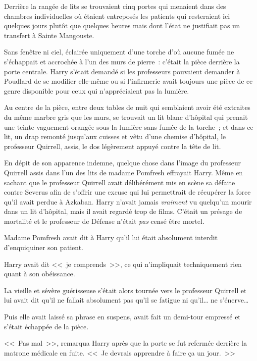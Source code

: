 Derrière la rangée de lits se trouvaient cinq portes qui menaient dans des chambres individuelles où étaient entreposés les patients qui resteraient ici quelques jours plutôt que quelques heures mais dont l'état ne justifiait pas un transfert à Sainte Mangouste.

Sans fenêtre ni ciel, éclairée uniquement d'une torche d'où aucune fumée ne s'échappait et accrochée à l'un des murs de pierre~: c'était la pièce derrière la porte centrale. Harry s'était demandé si les professeurs pouvaient demander à Poudlard de se modifier elle-même ou si l'infirmerie avait toujours une pièce de ce genre disponible pour ceux qui n'appréciaient pas la lumière.

Au centre de la pièce, entre deux tables de nuit qui semblaient avoir été extraites du même marbre gris que les murs, se trouvait un lit blanc d'hôpital qui prenait une teinte vaguement orangée sous la lumière sans fumée de la torche~; et dans ce lit, un drap remonté jusqu'aux cuisses et vêtu d'une chemise d'hôpital, le professeur Quirrell, assis, le dos légèrement appuyé contre la tête de lit.

En dépit de son apparence indemne, quelque chose dans l'image du professeur Quirrell assis dans l'un des lits de madame Pomfresh effrayait Harry. Même en sachant que le professeur Quirrell avait délibérément mis en scène sa défaite contre Severus afin de s'offrir une excuse qui lui permettrait de récupérer la force qu'il avait perdue à Azkaban. Harry n'avait jamais \emph{vraiment} vu quelqu'un mourir dans un lit d'hôpital, mais il avait regardé trop de films. C'était un présage de mortalité et le professeur de Défense n'était \emph{pas} censé être mortel.

Madame Pomfresh avait dit à Harry qu'il lui était absolument interdit d'enquiquiner son patient.

Harry avait dit <<~je comprends~>>, ce qui n'impliquait techniquement rien quant à son obéissance.

La vieille et sévère guérisseuse s'était alors tournée vers le professeur Quirrell et lui avait dit qu'il ne fallait absolument pas qu'il se fatigue ni qu'il… ne s'énerve…

Puis elle avait laissé sa phrase en suspens, avait fait un demi-tour empressé et s'était échappée de la pièce.

<<~Pas mal~>>, remarqua Harry après que la porte se fut refermée derrière la matrone médicale en fuite. <<~Je devrais apprendre à faire ça un jour.~>>

